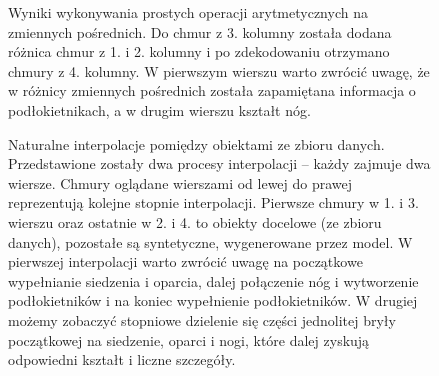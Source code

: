 \documentclass{iithesis}
\begin{document}
\begin{figure}
    \caption{\label{fig:arithmetic} Wyniki wykonywania prostych operacji arytmetycznych na zmiennych pośrednich.
    Do chmur z 3. kolumny została dodana różnica chmur z 1. i 2. kolumny i po zdekodowaniu otrzymano chmury z 4. kolumny.
    W pierwszym wierszu warto zwrócić uwagę, że w różnicy zmiennych pośrednich została zapamiętana
    informacja o podłokietnikach, a w drugim wierszu kształt nóg. }
\end{figure}

\begin{figure}
    \caption{\label{fig:interpolation} Naturalne interpolacje pomiędzy obiektami ze zbioru danych.
    Przedstawione zostały dwa procesy interpolacji -- każdy zajmuje dwa wiersze.
    Chmury oglądane wierszami od lewej do prawej reprezentują kolejne stopnie interpolacji.
    Pierwsze chmury w 1. i 3. wierszu oraz ostatnie w 2. i 4. to obiekty docelowe (ze zbioru danych),
    pozostałe są syntetyczne, wygenerowane przez model.
    W pierwszej interpolacji warto zwrócić uwagę na początkowe wypełnianie siedzenia i oparcia,
    dalej połączenie nóg i wytworzenie podłokietników i na koniec wypełnienie podłokietników.
    W drugiej możemy zobaczyć stopniowe dzielenie się części jednolitej bryły początkowej
    na siedzenie, oparci i nogi, które dalej zyskują odpowiedni kształt i liczne szczegóły. }
\end{figure}
\end{document}
